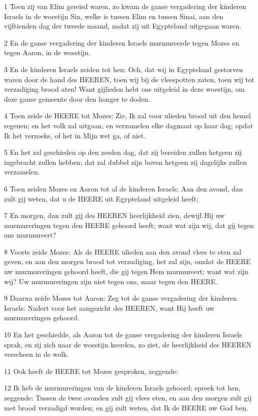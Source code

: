 \par 1 Toen zij van Elim gereisd waren, zo kwam de ganse vergadering der kinderen Israels in de woestijn Sin, welke is tussen Elim en tussen Sinai, aan den vijftienden dag der tweede maand, nadat zij uit Egypteland uitgegaan waren.
\par 2 En de ganse vergadering der kinderen Israels murmureerde tegen Mozes en tegen Aaron, in de woestijn.
\par 3 En de kinderen Israels zeiden tot hen: Och, dat wij in Egypteland gestorven waren door de hand des HEEREN, toen wij bij de vleespotten zaten, toen wij tot verzadiging brood aten! Want gijlieden hebt ons uitgeleid in deze woestijn, om deze ganse gemeente door den honger te doden.
\par 4 Toen zeide de HEERE tot Mozes: Zie, Ik zal voor ulieden brood uit den hemel regenen; en het volk zal uitgaan, en verzamelen elke dagmaat op haar dag; opdat Ik het verzoeke, of het in Mijn wet ga, of niet.
\par 5 En het zal geschieden op den zesden dag, dat zij bereiden zullen hetgeen zij ingebracht zullen hebben; dat zal dubbel zijn boven hetgeen zij dagelijks zullen verzamelen.
\par 6 Toen zeiden Mozes en Aaron tot al de kinderen Israels: Aan den avond, dan zult gij weten, dat u de HEERE uit Egypteland uitgeleid heeft;
\par 7 En morgen, dan zult gij des HEEREN heerlijkheid zien, dewijl Hij uw murmureringen tegen den HEERE gehoord heeft; want wat zijn wij, dat gij tegen ons murmureert?
\par 8 Voorts zeide Mozes: Als de HEERE ulieden aan den avond vlees te eten zal geven, en aan den morgen brood tot verzadiging, het zal zijn, omdat de HEERE uw murmureringen gehoord heeft, die gij tegen Hem murmureert; want wat zijn wij? Uw murmureringen zijn niet tegen ons, maar tegen den HEERE.
\par 9 Daarna zeide Mozes tot Aaron: Zeg tot de ganse vergadering der kinderen Israels: Nadert voor het aangezicht des HEEREN, want Hij heeft uw murmureringen gehoord.
\par 10 En het geschiedde, als Aaron tot de ganse vergadering der kinderen Israels sprak, en zij zich naar de woestijn keerden, zo ziet, de heerlijkheid des HEEREN verscheen in de wolk.
\par 11 Ook heeft de HEERE tot Mozes gesproken, zeggende:
\par 12 Ik heb de murmureringen van de kinderen Israels gehoord; spreek tot hen, zeggende: Tussen de twee avonden zult gij vlees eten, en aan den morgen zult gij met brood verzadigd worden; en gij zult weten, dat Ik de HEERE uw God ben.
